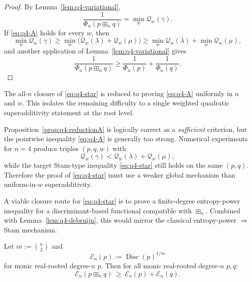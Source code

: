 \begin{proof}
By Lemma~\ref{lem:q4-variational},
\[
\frac1{\Phi_n(p\boxplus_n q)}=\min_w \mathcal Q_w(\gamma).
\]
If \eqref{eq:q4-A} holds for every $w$, then
\[
\min_w \mathcal Q_w(\gamma)
\ge
\min_w\big(\mathcal Q_w(\lambda)+\mathcal Q_w(\mu)\big)
\ge
\min_w \mathcal Q_w(\lambda)+\min_w \mathcal Q_w(\mu),
\]
and another application of Lemma~\ref{lem:q4-variational} gives
\[
\frac1{\Phi_n(p\boxplus_n q)}
\ge
\frac1{\Phi_n(p)}+\frac1{\Phi_n(q)}.
\]
\end{proof}

\begin{remark}
The all-$n$ closure of \eqref{eq:q4-star} is reduced to proving \eqref{eq:q4-A} uniformly in $n$ and $w$.
This isolates the remaining difficulty to a single weighted quadratic superadditivity statement at the root level.
\end{remark}

\begin{remark}
Proposition~\ref{prop:q4-reductionA} is logically correct as a \emph{sufficient} criterion, but the pointwise inequality \eqref{eq:q4-A} is generally too strong.
Numerical experiments for $n=4$ produce triples $(p,q,w)$ with
\[
\mathcal Q_w(\gamma)<\mathcal Q_w(\lambda)+\mathcal Q_w(\mu),
\]
while the target Stam-type inequality \eqref{eq:q4-star} still holds on the same $(p,q)$.
Therefore the proof of \eqref{eq:q4-star} must use a weaker global mechanism than uniform-in-$w$ superadditivity.
\end{remark}

\begin{remark}
A viable closure route for \eqref{eq:q4-star} is to prove a finite-degree entropy-power inequality for a discriminant-based functional compatible with $\boxplus_n$. Combined with Lemma~\ref{lem:q4-debruijn}, this would mirror the classical entropy-power $\Rightarrow$ Stam mechanism.
\end{remark}

\begin{conjecture}\label{conj:q4-disc-epi}
Let $m:=\binom{n}{2}$ and
\[
\mathcal E_n(p):=\operatorname{Disc}(p)^{1/m}
\]
for monic real-rooted degree-$n$ $p$.
Then for all monic real-rooted degree-$n$ $p,q$:
\[
\mathcal E_n(p\boxplus_n q)\ \ge\ \mathcal E_n(p)+\mathcal E_n(q).
\]
\end{conjecture}

